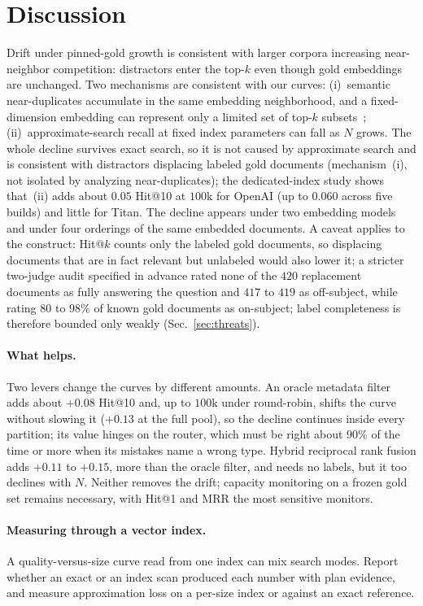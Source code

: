 \documentclass{ieeeaccess}
\makeatletter
\DeclareRobustCommand{\_}{\ifmmode\nfss@text{\textunderscore}\else\textunderscore\allowbreak\fi}
\makeatother
\begin{document}
\section{Discussion}
\label{sec:discussion}
Drift under pinned-gold growth is consistent with larger corpora increasing near-neighbor competition: distractors enter the top-$k$ even though gold embeddings are unchanged. Two mechanisms are consistent with our curves: (i)~semantic near-duplicates accumulate in the same embedding neighborhood, and a fixed-dimension embedding can represent only a limited set of top-$k$ subsets~\cite{weller2025limits}; (ii)~approximate-search recall at fixed index parameters can fall as $N$ grows. The whole decline survives exact search, so it is not caused by approximate search and is consistent with distractors displacing labeled gold documents (mechanism~(i), not isolated by analyzing near-duplicates); the dedicated-index study shows that~(ii) adds about $0.05$ Hit@10 at $100\text{k}$ for OpenAI (up to $0.060$ across five builds) and little for Titan. The decline appears under two embedding models and under four orderings of the same embedded documents. A caveat applies to the construct: Hit@$k$ counts only the labeled gold documents, so displacing documents that are in fact relevant but unlabeled would also lower it; a stricter two-judge audit specified in advance rated none of the $420$ replacement documents as fully answering the question and $417$ to $419$ as off-subject, while rating $80$ to $98\%$ of known gold documents as on-subject; label completeness is therefore bounded only weakly (Sec.~\ref{sec:threats}).

\paragraph{What helps.}
Two levers change the curves by different amounts. An oracle metadata filter adds about $+0.08$ Hit@10 and, up to $100\text{k}$ under round-robin, shifts the curve without slowing it ($+0.13$ at the full pool), so the decline continues inside every partition; its value hinges on the router, which must be right about $90\%$ of the time or more when its mistakes name a wrong type. Hybrid reciprocal rank fusion adds $+0.11$ to $+0.15$, more than the oracle filter, and needs no labels, but it too declines with $N$. Neither removes the drift; capacity monitoring on a frozen gold set remains necessary, with Hit@1 and MRR the most sensitive monitors.

\paragraph{Measuring through a vector index.}
A quality-versus-size curve read from one index can mix search modes. Report whether an exact or an index scan produced each number with plan evidence, and measure approximation loss on a per-size index or against an exact reference.
\end{document}
